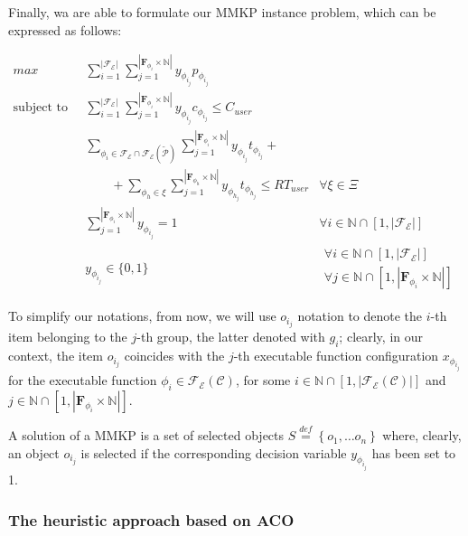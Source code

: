 \documentclass[12pt,a4paper]{report}
\newcommand{\mathDef}{\overset{\textit{def}}{=}}
\newcommand{\N}{\mathbb{N}}
\begin{document}
Finally, wa are able to formulate our MMKP instance problem, which can be expressed as follows:

\begin{align}
	\label{MMKP}
	\displaystyle max \quad & \displaystyle \sum_{i = 1}^{|\mathscr{F_E}|}  \sum_{j = 1}^{|\textbf{F}_{\phi_{i}} \times \N|} y_{\phi_{i_{j}}} p_{\phi_{i_{j}}} & \\	
	\text{subject to} \quad  & \displaystyle \sum_{i = 1}^{|\mathscr{F_E}|}  \sum_{j = 1}^{|\textbf{F}_{\phi_{i}} \times \N|} y_{\phi_{i_{j}}} c_{\phi_{i_{j}}} \leq C_{user} & \\
	& \displaystyle \sum_{\phi_i \in \mathscr{F_E} \cap \mathscr{F_E}(\mathcal{\widetilde{P}})}  \sum_{j = 1}^{|\textbf{F}_{\phi_{i}} \times \N|} y_{\phi_{i_{j}}} t_{\phi_{i_{j}}} + \nonumber \\
	& \qquad + \sum_{\phi_h \in \xi}  \sum_{j = 1}^{|\textbf{F}_{\phi_{h}} \times \N|} y_{\phi_{h_{j}}} t_{\phi_{h_{j}}} \leq RT_{user} & 
	\forall \xi \in \Xi \\	
	& \displaystyle \sum_{j = 1}^{|\textbf{F}_{\phi_{i}} \times \N|} y_{\phi_{i_{j}}} = 1 & \forall i \in \N \cap \left[ 1, |\mathscr{F_E}| \right] \\
	& y_{\phi_{i_{j}}} \in \lbrace 0, 1 \rbrace &
	\begin{array}{r}
		\forall i \in \N \cap \left[ 1, |\mathscr{F_E}| \right] \\ \forall j \in \N \cap [1,|\textbf{F}_{\phi_{i}} \times \N|]
	\end{array}
\end{align}


To simplify our notations, from now, we will use $o_{i_j}$ notation to denote the $i$-th item belonging to the $j$-th group, the latter denoted with $g_i$; clearly, in our context, the item $o_{i_j}$ coincides with the $j$-th executable function configuration $x_{\phi_{i_j}}$ for the executable function $\phi_i \in \mathscr{F_E}(\mathcal{C})$, for some $i \in \N \cap [1,|\mathscr{F_E}(\mathcal{C})|]$ and $j \in \N \cap [1,|\textbf{F}_{\phi_{i}} \times \N|]$. 

A solution of a MMKP is a set of selected objects $S \mathDef \left\{o_{1}, \ldots o_{n} \right\}$ where, clearly, an object $o_{i_j}$ is selected if the corresponding decision variable $y_{\phi_{i_j}}$ has been set to 1.


\subsubsection{The heuristic approach based on ACO}
\end{document}
